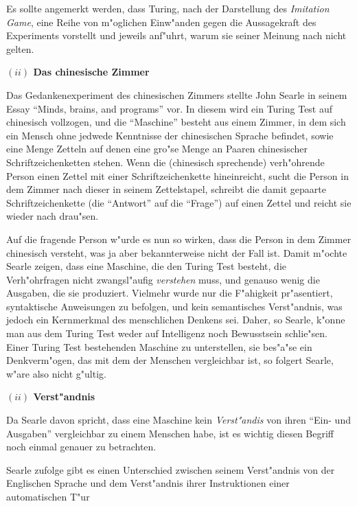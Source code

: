 \documentclass[a4paper, emulatestandardclasses, 12pt]{scrartcl}
\begin{document}
\begin{onehalfspace}
Es sollte angemerkt werden, dass Turing, nach der Darstellung des \emph{Imitation Game}, eine Reihe von m"oglichen Einw"anden gegen die Aussagekraft des Experiments vorstellt und jeweils anf"uhrt, warum sie seiner Meinung nach nicht gelten. %

\vspace{5mm}
\noindent\textbf{$(ii)$ Das chinesische Zimmer}

\noindent Das Gedankenexperiment des chinesischen Zimmers stellte John Searle in seinem Essay "`Minds, brains, and programs"' vor. In diesem wird ein Turing Test auf chinesisch vollzogen, und die "`Maschine"' besteht aus einem Zimmer, in dem sich ein Mensch ohne jedwede Kenntnisse der chinesischen Sprache befindet, sowie eine Menge Zetteln auf denen eine gro"se Menge an Paaren chinesischer Schriftzeichenketten stehen. Wenn die (chinesisch sprechende) verh"ohrende Person einen Zettel mit einer Schriftzeichenkette hineinreicht, sucht die Person in dem Zimmer nach dieser in seinem Zettelstapel, schreibt die damit gepaarte Schriftzeichenkette (die "`Antwort"' auf die "`Frage"') auf einen Zettel und reicht sie wieder nach drau"sen. 

Auf die fragende Person w"urde es nun so wirken, dass die Person in dem Zimmer chinesisch versteht, was ja aber bekannterweise nicht der Fall ist. Damit m"ochte Searle zeigen, dass eine Maschine, die den Turing Test besteht, die Verh"ohrfragen nicht zwangsl"aufig \emph{verstehen} muss, und genauso wenig die Ausgaben, die sie produziert. Vielmehr wurde nur die F"ahigkeit pr"asentiert, syntaktische Anweisungen zu befolgen, und kein semantisches Verst"andnis, was jedoch ein Kernmerkmal des menschlichen Denkens sei. Daher, so Searle, k"onne man aus dem Turing Test weder auf Intelligenz noch Bewusstsein schlie"sen. Einer Turing Test bestehenden Maschine zu unterstellen, sie bes"a"se ein Denkverm"ogen, das mit dem der Menschen vergleichbar ist, so folgert Searle, w"are also nicht g"ultig. 

\vspace{5mm}
\noindent\textbf{$(ii)$ Verst"andnis}

\noindent Da Searle davon spricht, dass eine Maschine kein \emph{Verst"andis} von ihren "`Ein- und Ausgaben"' vergleichbar zu einem Menschen habe, ist es wichtig diesen Begriff noch einmal genauer zu betrachten.

Searle zufolge gibt es einen Unterschied zwischen seinem Verst"andnis von der Englischen Sprache und dem Verst"andnis ihrer Instruktionen einer automatischen T"ur


\end{onehalfspace}
\end{document}
